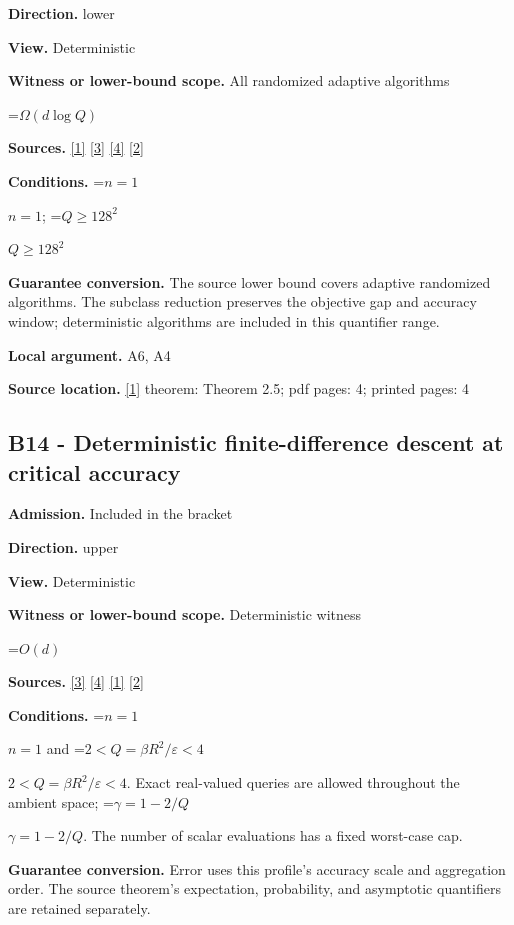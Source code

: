 \documentclass[10pt,a4paper]{article}
\newcommand{\AtlasMath}[1]{\par\begingroup\centering\setbox0=\hbox{$\displaystyle #1$}\ifdim\wd0>1.4\linewidth\typeout{ATLAS WIDE FORMULA: \the\wd0}\fi\ifdim\wd0>\linewidth\resizebox{\linewidth}{!}{\box0}\else\box0\fi\par\endgroup}
\newcommand{\AtlasInlineMath}[1]{\begingroup\setbox0=\hbox{$#1$}\ifdim\wd0>.4\linewidth\endgroup\AtlasMath{#1}\else\endgroup$#1$\fi}
\begin{document}
\textbf{Direction.} lower

\textbf{View.} Deterministic

\textbf{Witness or lower-bound scope.} All randomized adaptive algorithms

\AtlasMath{\Omega(d\log Q)}
\textbf{Sources.} \href{https://arxiv.org/html/2610.00345v1}{[1]} \href{https://arxiv.org/html/2607.16558v2}{[3]} \href{https://www.mathnet.ru/php/archive.phtml?jrnid=mzm&option_lang=eng&paperid=1697&wshow=paper}{[4]} \href{https://arxiv.org/abs/2109.08858}{[2]}

\textbf{Conditions.} \AtlasInlineMath{n=1}; \AtlasInlineMath{Q\ge128^2}

\textbf{Guarantee conversion.} The source lower bound covers adaptive randomized algorithms. The subclass reduction preserves the objective gap and accuracy window; deterministic algorithms are included in this quantifier range.

\textbf{Local argument.} A6, A4

\textbf{Source location.} \href{https://arxiv.org/html/2610.00345v1}{[1]} theorem: Theorem 2.5; pdf pages: 4; printed pages: 4

\subsection{B14 - Deterministic finite-difference descent at critical accuracy}
\textbf{Admission.} Included in the bracket

\textbf{Direction.} upper

\textbf{View.} Deterministic

\textbf{Witness or lower-bound scope.} Deterministic witness

\AtlasMath{O(d)}
\textbf{Sources.} \href{https://arxiv.org/html/2607.16558v2}{[3]} \href{https://www.mathnet.ru/php/archive.phtml?jrnid=mzm&option_lang=eng&paperid=1697&wshow=paper}{[4]} \href{https://arxiv.org/html/2610.00345v1}{[1]} \href{https://arxiv.org/abs/2109.08858}{[2]}

\textbf{Conditions.} \AtlasInlineMath{n=1} and \AtlasInlineMath{2<Q=\beta R^2/\varepsilon<4}. Exact real-valued queries are allowed throughout the ambient space; \AtlasInlineMath{\gamma=1-2/Q}. The number of scalar evaluations has a fixed worst-case cap.

\textbf{Guarantee conversion.} Error uses this profile's accuracy scale and aggregation order. The source theorem's expectation, probability, and asymptotic quantifiers are retained separately.
\end{document}
